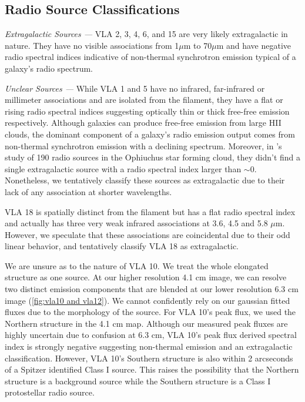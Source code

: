 \documentclass[apj]{emulateapj}
\begin{document}
\subsection{Radio Source Classifications}
\label{sec:radio source classifications}

\newcommand{\sourcenote}[1]{\textit{#1 ---}}

\sourcenote{Extragalactic Sources}
VLA 2, 3, 4, 6, and 15 are very likely extragalactic in nature. They have no visible associations from 1$\mu$m to 70$\mu$m and have negative radio spectral indices indicative of non-thermal synchrotron emission typical of a galaxy's radio spectrum.

\sourcenote{Unclear Sources}
While VLA 1 and 5 have no infrared, far-infrared or millimeter associations and are isolated from the filament, they have a flat or rising radio spectral indices suggesting optically thin or thick free-free emission respectively. Although galaxies can produce free-free emission from large HII clouds, the dominant component of a galaxy's radio emission output comes from non-thermal synchrotron emission with a declining spectrum. Moreover, in \citet{Dzib13}'s study of 190 radio sources in the Ophiuchus star forming cloud, they didn't find a single extragalactic source with a radio spectral index larger than $\sim$0. Nonetheless, we tentatively classify these sources as extragalactic due to their lack of any association at shorter wavelengths. 

VLA 18 is spatially distinct from the filament but has a flat radio spectral index and actually has three very weak infrared associations at 3.6, 4.5 and 5.8 $\mu$m. However, we speculate that these associations are coincidental due to their odd linear behavior, and tentatively classify VLA 18 as extragalactic. 

We are unsure as to the nature of VLA 10. We treat the whole elongated structure as one source. At our higher resolution 4.1 cm image, we can resolve two distinct emission components that are blended at our lower resolution 6.3 cm image (\autoref{fig:vla10 and vla12}). We cannot confidently rely on our gaussian fitted fluxes due to the morphology of the source. For VLA 10's peak flux, we used the Northern structure in the 4.1 cm map. Although our measured peak fluxes are highly uncertain due to confusion at 6.3 cm, VLA 10's peak flux derived spectral index is strongly negative suggesting non-thermal emission and an extragalactic classification. However, VLA 10's Southern structure is also within 2 arcseconds of a Spitzer identified Class I source. This raises the possibility that the Northern structure is a background source while the Southern structure is a Class I protostellar radio source. 
\end{document}
